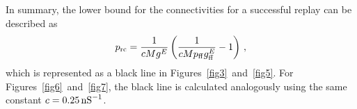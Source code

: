 %     
    In summary, the lower bound for the connectivities for a successful replay
    can be described as 
    \[
      p_{\rm rc} = \frac{1}{cMg^E} \left( \frac{1}{cMp_{\rm ff}g_{\rm ff}^E} - 1\right) \,,
    \]
    which is represented as a black line in Figures~\ref{fig3}~and~\ref{fig5}.
    For Figures~\ref{fig6}~and~\ref{fig7}, the black line is calculated
    analogously using the same constant $c = 0.25 \, {\rm nS}^{-1}$.

%
